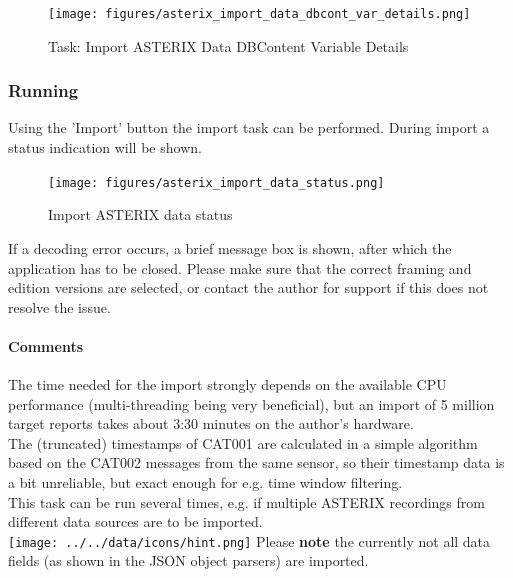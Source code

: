 \begin{figure}[H]
  \center
    \texttt{[image: figures/asterix\_import\_data\_dbcont\_var\_details.png]}
  \caption{Task: Import ASTERIX Data DBContent Variable Details}
\end{figure}

\subsubsection{Running}

Using the 'Import' button the import task can be performed. During import a status indication will be shown. \\

\begin{figure}[H]
  \center
    \texttt{[image: figures/asterix\_import\_data\_status.png]}
  \caption{Import ASTERIX data status}
\end{figure}

If a decoding error occurs, a brief message box is shown, after which the application has to be closed. 
Please make sure that the correct framing and edition versions are selected, or contact the author for support if this does not resolve the issue. \\


\paragraph{Comments}
The time needed for the import strongly depends on the available CPU performance (multi-threading being very beneficial), but an import of 5 million target reports takes about 3:30 minutes on the author's hardware. \\

The (truncated) timestamps of CAT001 are calculated in a simple algorithm based on the CAT002 messages from the same sensor, so their timestamp data is a bit unreliable, but exact enough for e.g. time window filtering. \\

This task can be run several times, e.g. if multiple ASTERIX recordings from different data sources are to be imported. \\

\texttt{[image: ../../data/icons/hint.png]} Please \textbf{note} the currently not all data fields (as shown in the JSON object parsers) are imported.\\


